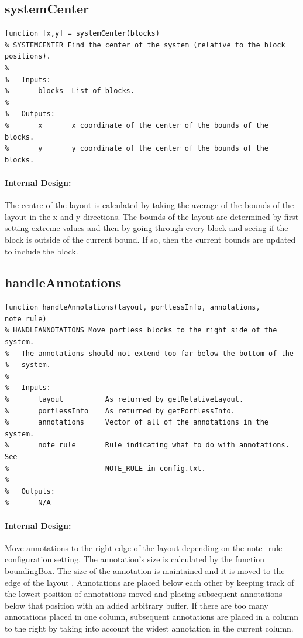 \documentclass[12pt,letterpaper]{report}
\begin{document}
\subsection{systemCenter}
\begin{lstlisting}
function [x,y] = systemCenter(blocks)
% SYSTEMCENTER Find the center of the system (relative to the block positions).
%
%   Inputs:
%       blocks  List of blocks.
%
%   Outputs:
%       x       x coordinate of the center of the bounds of the blocks.
%       y       y coordinate of the center of the bounds of the blocks.
\end{lstlisting}
\paragraph{Internal Design:} The centre of the layout is calculated by taking the average of the bounds of the layout in the x and y directions. The bounds of the layout are determined by first setting extreme values and then by going through every block and seeing if the block is outside of the current bound. If so, then the current bounds are updated to include the block.

\subsection{handleAnnotations}
\begin{lstlisting}
function handleAnnotations(layout, portlessInfo, annotations, note_rule)
% HANDLEANNOTATIONS Move portless blocks to the right side of the system.
%   The annotations should not extend too far below the bottom of the
%   system.
%
%   Inputs:
%       layout          As returned by getRelativeLayout.
%       portlessInfo    As returned by getPortlessInfo.
%       annotations     Vector of all of the annotations in the system.
%       note_rule       Rule indicating what to do with annotations. See
%                       NOTE_RULE in config.txt.
%
%   Outputs:
%       N/A
\end{lstlisting}
\paragraph{Internal Design:} Move annotations to the right edge of the layout depending on the note\_rule configuration setting. The annotation's size is calculated by the function \hyperref[boundingBox]{boundingBox}. The size of the annotation is maintained and it is moved to the edge of the layout . Annotations are placed below each other by keeping track of the lowest position of annotations moved and placing subsequent annotations below that position with an added arbitrary buffer. If there are too many annotations placed in one column, subsequent annotations are placed in a column to the right by taking into account the widest annotation in the current column.
\end{document}
